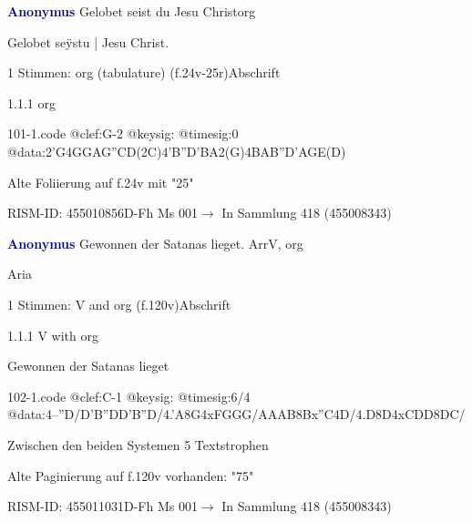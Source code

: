 \documentclass[twocolumn, 12pt]{book}
\begin{document}
\par \vspace{16pt} \textcolor{darkblue}{\textbf{Anonymus  }}\hfillplus{\textbf{[101]}}\newline Gelobet seist du Jesu Christ\newline org
\par \begin{itshape}[f.24v, at left:] Gelobet seÿstu | Jesu Christ.\end{itshape} 
\par \textcolor{darkblue}{}  1 Stimmen: org (tabulature)  (f.24v-25r)\newline Abschrift
\par 1.1.1  org  
\begin{filecontents*}{101-1.code}
@clef:G-2
@keysig:
@timesig:0
@data:2'G4GGAG''CD(2C)4'B''D'BA2(G)4BAB''D'AGE(D)
\end{filecontents*}
\newline %
\par Alte Foliierung auf f.24v mit "25"
\par RISM-ID: 455010856\newline D-Fh  Ms 001\newline $\rightarrow$ In Sammlung 418 (455008343)
      
\par \vspace{16pt} \textcolor{darkblue}{\textbf{Anonymus  }}\hfillplus{\textbf{[102]}}\newline Gewonnen der Satanas lieget. Arr\newline V, org
\par \begin{itshape}[f.120v, heading:] Aria\end{itshape} 
\par \textcolor{darkblue}{}  1 Stimmen: V and org  (f.120v)\newline Abschrift
\par 1.1.1  V with org\newline \begin{footnotesize} Gewonnen der Satanas lieget \end{footnotesize}  
\begin{filecontents*}{102-1.code}
@clef:C-1
@keysig:
@timesig:6/4
@data:4--''D/D'B''DD'B''D/4.'A8G4xFGGG/AAAB{8Bx''C}4D/4.D8D4xCDD{8DC}/
\end{filecontents*}
\newline %
\par Zwischen den beiden Systemen 5 Textstrophen
\par Alte Paginierung auf f.120v vorhanden: "75"
\par RISM-ID: 455011031\newline D-Fh  Ms 001\newline $\rightarrow$ In Sammlung 418 (455008343)
      
\end{document}
